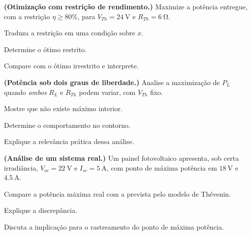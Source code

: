 \begin{questao}[4]{}

\textbf{(Otimização com restrição de rendimento.)} Maximize a potência
entregue, com a restrição $\eta\ge80\%$, para
$V_{Th}=\SI{24}{\volt}$ e $R_{Th}=\SI{6}{\ohm}$.
\begin{itensq}
\item Traduza a restrição em uma condição sobre $x$.
\item Determine o ótimo restrito.
\item Compare com o ótimo irrestrito e interprete.
\end{itensq}


\end{questao}
\begin{questao}[4]{}

\textbf{(Potência sob dois graus de liberdade.)} Analise a maximização de
$P_L$ quando \emph{ambos} $R_L$ e $R_{Th}$ podem variar, com $V_{Th}$ fixo.
\begin{itensq}
\item Mostre que não existe máximo interior.
\item Determine o comportamento no contorno.
\item Explique a relevância prática dessa análise.
\end{itensq}


\end{questao}
\begin{questao}[4]{}

\textbf{(Análise de um sistema real.)} Um painel fotovoltaico apresenta, sob
certa irradiância, $V_{oc}=\SI{22}{\volt}$ e $I_{sc}=\SI{5}{\ampere}$, com
ponto de máxima potência em $\SI{18}{\volt}$ e $\SI{4.5}{\ampere}$.
\begin{itensq}
\item Compare a potência máxima real com a prevista pelo modelo de Thévenin.
\item Explique a discrepância.
\item Discuta a implicação para o rastreamento do ponto de máxima potência.
\end{itensq}


\end{questao}


